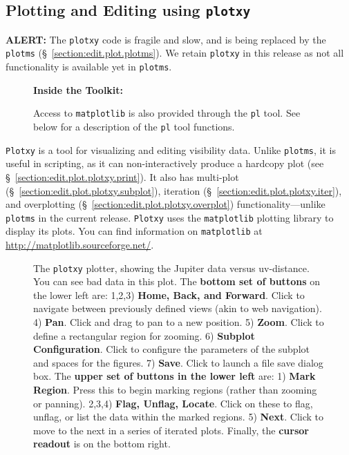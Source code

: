 \subsection{Plotting and Editing using {\tt plotxy}}
\label{section:edit.plot.plotxy}

{\bf ALERT:} The {\tt plotxy} code is fragile and slow, and is being replaced by the {\tt plotms} (\S~\ref{section:edit.plot.plotms}). We retain {\tt plotxy} in this release as not all functionality is available yet in {\tt plotms}.

\begin{wrapfigure}{r}{2.5in}
  \begin{boxedminipage}{2.5in}
     \centerline{\bf Inside the Toolkit:}
     Access to {\tt matplotlib} is also provided through 
     the {\tt pl} tool. 
     See below for a description of the {\tt pl} tool functions. 
  \end{boxedminipage}
\end{wrapfigure}

{\tt Plotxy} is a tool for visualizing and editing visibility data. Unlike {\tt plotms}, it is useful in scripting, as it can non-interactively produce a hardcopy plot (see \S~\ref{section:edit.plot.plotxy.print}). It also has multi-plot (\S~\ref{section:edit.plot.plotxy.subplot}), iteration (\S~\ref{section:edit.plot.plotxy.iter}), and overplotting (\S~\ref{section:edit.plot.plotxy.overplot}) functionality---unlike {\tt plotms} in the current release. {\tt Plotxy} uses the {\tt matplotlib} plotting library to display its plots. You can find information on {\tt matplotlib} at \url{http://matplotlib.sourceforge.net/}.

\begin{figure}[h!]
\begin{center}
\caption{\label{fig:matplotlib}The {\tt plotxy} plotter, showing the
  Jupiter data versus uv-distance.  You can see bad data in this plot.
  The {\bf bottom set of buttons} on the
  lower left are: 1,2,3) {\bf Home, Back, and Forward}. Click to
  navigate between previously defined views (akin to web navigation).
  4) {\bf Pan}. Click and drag to pan to a new position. 5) {\bf
  Zoom}. Click to define a rectangular region for zooming. 6) {\bf
  Subplot Configuration}. Click to configure the parameters of the
  subplot and spaces for the figures. 7) {\bf Save}. Click to launch a
  file save dialog box.  The {\bf upper set of buttons in the lower left} are:
  1) {\bf Mark Region}. Press this to begin marking regions (rather than
  zooming or panning).  2,3,4) {\bf Flag, Unflag, Locate}.  Click on these
  to flag, unflag, or list the data within the marked regions.  5) {\bf Next}.
  Click to move to the next in a series of iterated plots.
  Finally, the {\bf cursor readout} is on the bottom right.}
\hrulefill
\end{center}
\end{figure}

